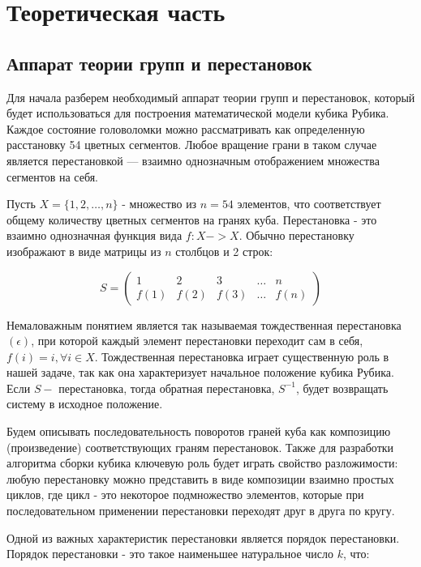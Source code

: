 \documentclass{article}
\begin{document}
\section{Теоретическая часть}
\subsection{Аппарат теории групп и перестановок}
Для начала разберем необходимый аппарат теории групп и перестановок, который будет использоваться для построения математической модели кубика Рубика. Каждое состояние головоломки можно рассматривать как определенную расстановку 54 цветных сегментов. Любое вращение грани в таком случае является перестановкой — взаимно однозначным отображением множества сегментов на себя.

Пусть $X = \{1, 2, \dots, n\}$ - множество из $n = 54$ элементов, что соответствует общему количеству цветных сегментов на гранях куба. Перестановка - это взаимно однозначная функция вида $f: X -> X$. Обычно перестановку изображают в виде матрицы из $n$ столбцов и 2 строк:

\begin{equation}
S = \begin{pmatrix}
1 & 2 & 3 & \dots & n \\
f(1) & f(2) & f(3) & \dots & f(n)
\end{pmatrix}
\end{equation}

Немаловажным понятием является так называемая тождественная перестановка $(\epsilon)$, при которой каждый элемент перестановки переходит сам в себя, $f(i) = i, \forall i\in X$. Тождественная перестановка играет существенную роль в нашей задаче, так как она характеризует начальное положение кубика Рубика. Если $S - $ перестановка, тогда обратная перестановка, $S^{-1}$, будет возвращать систему в исходное положение.

Будем описывать последовательность поворотов граней куба как композицию (произведение) соответствующих граням перестановок. Также для разработки алгоритма сборки кубика ключевую роль будет играть свойство разложимости: любую перестановку можно представить в виде композиции взаимно простых циклов, где цикл - это некоторое подмножество элементов, которые при последовательном применении перестановки переходят друг в друга по кругу.

Одной из важных характеристик перестановки является порядок перестановки. Порядок перестановки - это такое наименьшее натуральное число $k$, что:
\end{document}
